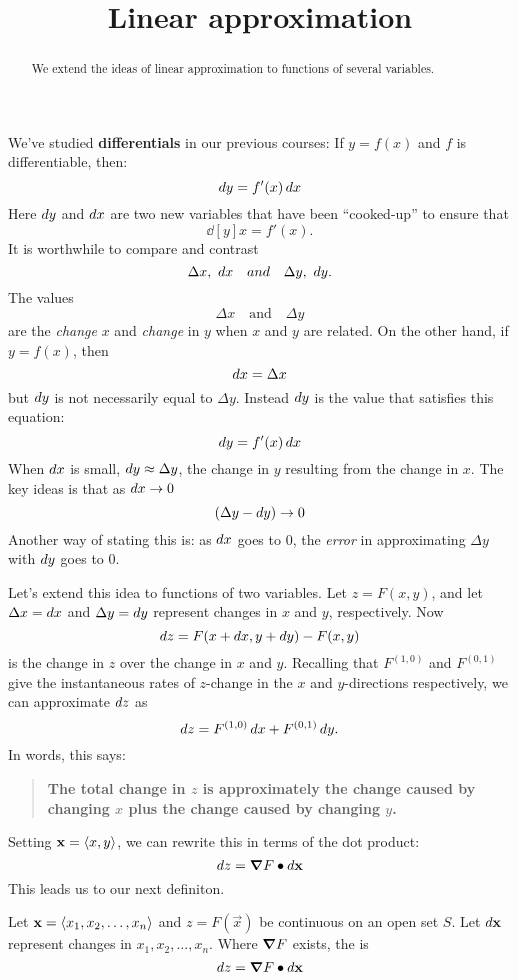 \documentclass{ximera}
\title[Dig-In:]{Linear approximation}
\begin{document}
\begin{abstract}
  We extend the ideas of linear approximation to functions of several
  variables.
\end{abstract}
\maketitle


We've studied \textbf{differentials} in our previous courses: If
$y=f(x)$ and $f$ is differentiable, then:
\[
\mathop{}\!d y=f'(x)\mathop{}\!d x
\]
Here $\mathop{}\!d y$ and $\mathop{}\!d x$ are two new variables that have been
``cooked-up'' to ensure that
\[
\dd[y]{x} = f'(x).
\]
It is worthwhile to compare and contrast
\[
\Delta x, \ \mathop{}\!d x \quad{and}\quad \Delta y,\  \mathop{}\!d y.
\]
The values
\[
\Delta x \quad\text{and}\quad \Delta y
\]
are the \textit{change} $x$ and \textit{change} in $y$ when $x$ and
$y$ are related. On the other hand, if $y=f(x)$, then
\[
\mathop{}\!d x = \Delta x
\]
but $\mathop{}\!d y$ is not necessarily equal to $\Delta y$. Instead $\mathop{}\!d y$ is
the value that satisfies this equation:
\[
\mathop{}\!d y=f'(x)\mathop{}\!d x
\]
When $\mathop{}\!d x$ is small, $\mathop{}\!d y\approx \Delta y$, the change in $y$
resulting from the change in $x$. The key ideas is that as $\mathop{}\!d x\to 0$
\[
(\Delta y - \mathop{}\!d y) \to 0
\]
Another way of stating this is: as $\mathop{}\!d x$ goes to $0$, the \textit{error}
in approximating $\Delta y$ with $\mathop{}\!d y$ goes to $0$.


Let's extend this idea to functions of two variables. Let $z=F(x,y)$,
and let $\Delta x = \mathop{}\!d x$ and $\Delta y=\mathop{}\!d y$ represent changes in $x$
and $y$, respectively. Now
\[
\mathop{}\!d z = F(x+\mathop{}\!d x,y+\mathop{}\!d y) - F(x,y)
\]
is the change in $z$ over the change in $x$ and $y$. Recalling that
$F^{(1,0)}$ and $F^{(0,1)}$ give the instantaneous rates of $z$-change
in the $x$ and $y$-directions respectively, we can approximate $\mathop{}\!d z$ as
\[
\mathop{}\!d z = F^{(1,0)}\mathop{}\!d x+F^{(0,1)}\mathop{}\!d y.
\]
In words, this says:
\begin{quote}
  \textbf{The total change in $z$ is approximately the change caused
    by changing $x$ plus the change caused by changing $y$.}
\end{quote}
Setting $\mathbf{x}=\left\langle x,y\right\rangle$, we can rewrite this in terms of the
dot product:
\[
\mathop{}\!d z = \boldsymbol\nabla F \bullet \mathop{}\!d \mathbf{x}
\]
This leads us to our next definiton.
\begin{definition}
  Let $\mathbf{x} = \left\langle x_1,x_2,\dots,x_n\right\rangle$ and $z=F(\vec{x})$ be
  continuous on an open set $S$. Let $\mathop{}\!d \mathbf{x}$ represent changes in
  $x_1,x_2,\dots,x_n$. Where $\boldsymbol\nabla F$ exists, the  is
  \[
  \mathop{}\!d z  = \boldsymbol\nabla F \bullet \mathop{}\!d \mathbf{x}
  \]
\end{definition}
\end{document}
